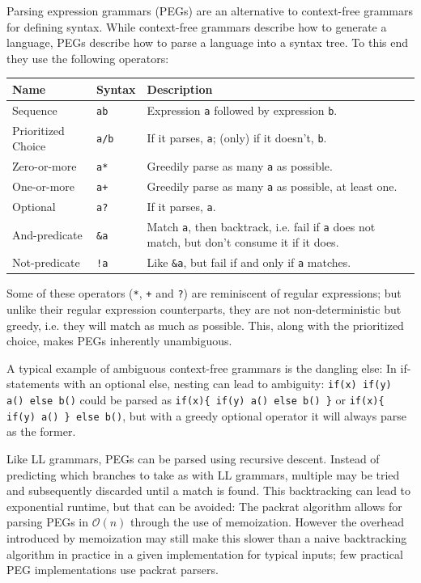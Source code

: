			Parsing expression grammars (PEGs) are an alternative to context-free grammars for defining syntax\cite{peg}. While context-free grammars describe how to generate a language, PEGs describe how to parse a language into a syntax tree. To this end they use the following operators:
			
			\begin{center}
			\begin{tabular}{ l l p{10cm} }
			\toprule
			Name               & Syntax          & Description \\
			\midrule
			Sequence           & \lstinline$ab$  & Expression \lstinline$a$ followed by expression \lstinline$b$. \\
			Prioritized Choice & \lstinline$a/b$ & If it parses, \lstinline$a$; (only) if it doesn't, \lstinline$b$. \\
			Zero-or-more       & \lstinline$a*$  & Greedily parse as many \lstinline$a$ as possible. \\
			One-or-more        & \lstinline$a+$  & Greedily parse as many \lstinline$a$ as possible, at least one. \\
			Optional           & \lstinline$a?$  & If it parses, \lstinline$a$. \\
			And-predicate      & \lstinline$&a$  & Match \lstinline$a$, then backtrack, i.e. fail if \lstinline$a$ does not match, but don't consume it if it does. \\
			Not-predicate      & \lstinline$!a$  & Like \lstinline$&a$, but fail if and only if \lstinline$a$ matches. \\
			\bottomrule
			\end{tabular}
			\end{center}
			
			Some of these operators (\lstinline$*$, \lstinline$+$ and \lstinline$?$) are reminiscent of regular expressions; but unlike their regular expression counterparts, they are not non-deterministic but greedy, i.e. they will match as much as possible. This, along with the prioritized choice, makes PEGs inherently unambiguous.
			
			A typical example of ambiguous context-free grammars is the dangling else: In if-statements with an optional else, nesting can lead to ambiguity: \lstinline$if(x) if(y) a() else b()$ could be parsed as \lstinline$if(x){ if(y) a() else b() }$ or \lstinline$if(x){ if(y) a() } else b()$, but with a greedy optional operator it will always parse as the former.
			
			Like LL grammars, PEGs can be parsed using recursive descent. Instead of predicting which branches to take as with LL grammars, multiple may be tried and subsequently discarded until a match is found. This backtracking can lead to exponential runtime, but that can be avoided: The packrat algorithm\cite{packrat} allows for parsing PEGs in $\mathcal{O}(n)$ through the use of memoization. However the overhead introduced by memoization may still make this slower than a naive backtracking algorithm in practice in a given implementation for typical inputs; few practical PEG implementations use packrat parsers.
			
